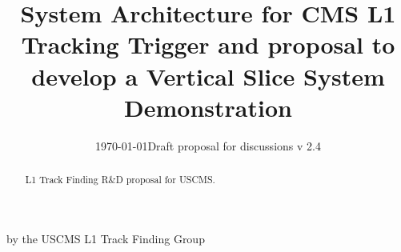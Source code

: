 \documentclass{cmspaper}
\begin{document}

\begin{titlepage}
\date{\today}
\date{Draft proposal for discussions v 2.4}
\title{System Architecture for CMS L1 Tracking Trigger and proposal to develop a Vertical Slice System Demonstration}
\begin{Authlist}
by the USCMS L1 Track Finding Group
\end{Authlist}


\begin{abstract}
L1 Track Finding R\&D proposal for USCMS.
\end{abstract}
\end{titlepage}
\newpage
\tableofcontents
\newpage

%
%








%



\newpage
\thispagestyle{empty}
\end{document}
